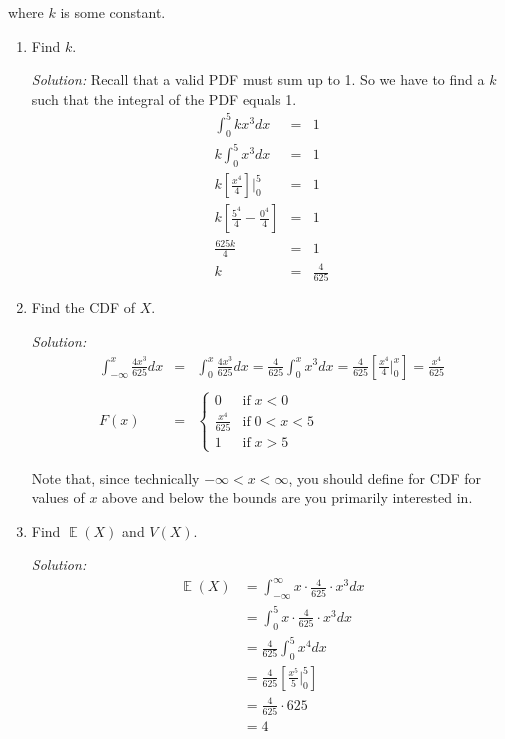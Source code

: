 \documentclass[11pt]{article}
\DeclareMathOperator*{\E}{\mathbb{E}}
\begin{document}
\noindent where $k$ is some constant.
 
\pagebreak
\begin{enumerate}
\item Find $k$.

\textit{Solution:} Recall that a valid PDF must sum up to 1. So we have to find a $k$ such that the integral of the PDF equals 1.
\begin{eqnarray*}
\int_0^5 kx^3 dx &=& 1 \\
k \int_0^5 x^3 dx &=& 1 \\
k \left[ \frac{x^4}{4} \right]\bigg|_0^5 &=& 1 \\
k \left[ \frac{5^4}{4} - \frac{0^4}{4} \right] &=& 1 \\
\frac{625k}{4} &=& 1 \\
k &=& \frac{4}{625}
\end{eqnarray*}

\medskip

\item Find the CDF of $X$.

{\it Solution:}
\begin{eqnarray*}
\int_{-\infty}^x \frac{4x^3}{625} dx &=& \int_{0}^x \frac{4x^3}{625} dx = \frac{4}{625} \int_0^x x^3dx = \frac{4}{625} \left[ \frac{x^4}{4} \Big|_0^x \right] = \frac{x^4}{625} \\ \\
F(x) &=&
\begin{cases}
0 & \text{if} \; x < 0 \\
\frac{x^4}{625} & \text{if} \; 0 < x < 5 \\
1 & \text{if} \; x > 5
\end{cases}
\end{eqnarray*}

Note that, since technically $-\infty < x < \infty$, you should define for CDF for values of $x$ above and below the bounds are you primarily interested in.

\medskip

\item Find $\E(X)$ and $V(X)$.

{\it Solution:}
\begin{align*}
\E(X) &= \int_{-\infty}^\infty x \cdot \frac{4}{625} \cdot x^3 dx \\
&= \int_{0}^5 x \cdot \frac{4}{625} \cdot x^3 dx \\
&= \frac{4}{625} \int_0^5 x^4 dx \\
&= \frac{4}{625} \left[ \frac{x^5}{5} \Big|_0^5 \right] \\
&= \frac{4}{625} \cdot 625 \\
&= 4
\end{align*}


\end{enumerate}
\end{document}
